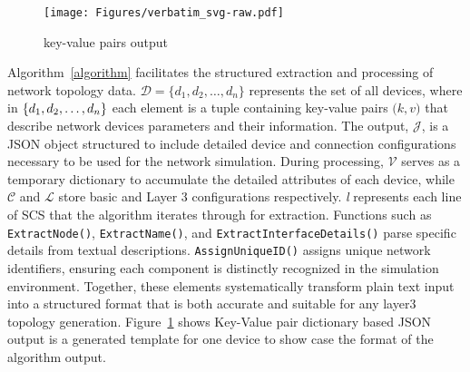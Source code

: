 

\begin{figure}[ht!]
    \centering
    \texttt{[image: Figures/verbatim\_svg-raw.pdf]}
    \caption{key-value pairs output}
    \vspace{-3mm}
    \label{fig: key-value pairs output}
\end{figure}

Algorithm~\ref{algorithm} facilitates the structured extraction and processing of network topology data. $\mathcal{D} = \{d_1, d_2, \ldots, d_n\}$ represents the set of all devices, where in  $\mathcal \{d_1, d_2, \ldots, d_n\}$ each element is a tuple containing key-value pairs $\mathcal(k, v)$ that describe network devices parameters and their information. The output, $\mathcal{J}$, is a JSON object structured to include detailed device and connection configurations necessary to be used for the network simulation. During processing, $\mathcal{V}$ serves as a temporary dictionary to accumulate the detailed attributes of each device, while $\mathcal{C}$ and $\mathcal{L}$ store basic and Layer 3 configurations respectively. \textit{l} represents each line of SCS that the algorithm iterates through for extraction. Functions such as \verb|ExtractNode()|, \verb|ExtractName()|, and \verb|ExtractInterfaceDetails()| parse specific details from textual descriptions. \verb|AssignUniqueID()| assigns unique network identifiers, ensuring each component is distinctly recognized in the simulation environment. Together, these elements systematically transform plain text input into a structured format that is both accurate and suitable for any layer3 topology generation.
Figure~\ref{fig: key-value pairs output} shows Key-Value pair dictionary based JSON output is a generated template for one device to show case the format of the algorithm output.


